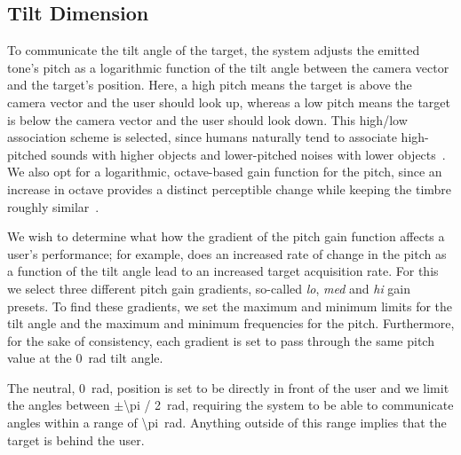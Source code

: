 \documentclass[format=sigconf, review=true, screen=true, anonymous=true]{acmart}
\begin{document}


\subsection{Tilt Dimension}

To communicate the tilt angle of the target, the system adjusts the emitted tone's pitch as a logarithmic function of the tilt angle between the camera vector and the target's position. Here, a high pitch means the target is above the camera vector and the user should look up, whereas a low pitch means the target is below the camera vector and the user should look down. This high/low association scheme is selected, since humans naturally tend to associate high-pitched sounds with higher objects and lower-pitched noises with lower objects~\cite{pratt1930spatial}. We also opt for a logarithmic, octave-based gain function for the pitch, since an increase in octave provides a distinct perceptible change while keeping the timbre roughly similar~\cite{shepard1964circularity}.

We wish to determine what how the gradient of the pitch gain function affects a user's performance; for example, does an increased rate of change in the pitch as a function of the tilt angle lead to an increased target acquisition rate. For this we select three different pitch gain gradients, so-called \emph{lo}, \emph{med} and \emph{hi} gain presets. To find these gradients, we set the maximum and minimum limits for the tilt angle and the maximum and minimum frequencies for the pitch. Furthermore, for the sake of consistency, each gradient is set to pass through the same pitch value at the \SI{0}{\radian} tilt angle.   

The neutral, \SI{0}{\radian}, position is set to be directly in front of the user and we limit the angles between $\pm$\SI[quotient-mode=fraction]{\pi / 2}{\radian}, requiring the system to be able to communicate angles within a range of \SI{\pi}{\radian}. Anything outside of this range implies that the target is behind the user.
\end{document}
